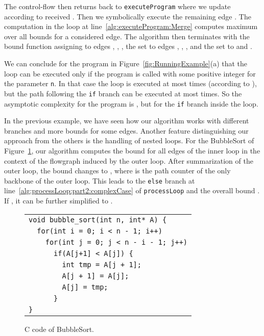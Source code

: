 \documentclass[10pt,a4paper]{article}
\newcommand{\var}[1]{\texttt{#1}}
\begin{document}
The control-flow then returns back to \texttt{executeProgram} where we
update  according to received . Then we
symbolically execute the remaining edge . The computation in
the loop at line~\ref{alg:executeProgram:Merge} computes maximum over
all bounds for a considered edge.  The algorithm then terminates with
the bound function  assigning  to edges
, , , the set  to edges
, , , and the set  to
 and .

We can conclude for the program in Figure~\ref{fig:RunningExample}(a)
that the loop can be executed only if the program is called with some
positive integer  for the parameter \var{n}. In that case
the loop is executed at most  times (according
to ), but the path following the \texttt{if} branch
can be executed at most  times. So
the asymptotic complexity for the program is ,
but  for the \texttt{if} branch inside the loop.



In the previous example, we have seen how our algorithm works with
different branches and more bounds for some edges. Another feature
distinguishing our approach from the others is the handling of nested
loops. For the BubbleSort of Figure~\ref{fig:bubble}, our algorithm
computes the bound  for all edges of
the inner loop in the context of the flowgraph induced by the outer
loop. After summarization of the outer loop, the bound changes to
, where  is the path counter
of the only backbone of the outer loop. This leads to the
\texttt{else} branch at line~\ref{alg:processLoop:part2:complexCase}
of \texttt{processLoop} and the overall bound
. If
, it can be further simplified to
.

\begin{figure}[t] \begin{center}
\begin{tabular}{l}
\texttt{void bubble\_sort(int n, int* A) \{}\\
\texttt{~~for(int i = 0; i < n - 1; i++)}\\
\texttt{~~~~for(int j = 0; j < n - i - 1; j++)}\\
\texttt{~~~~~~if(A[j+1] < A[j]) \{}\\
\texttt{~~~~~~~~int tmp = A[j + 1];}\\
\texttt{~~~~~~~~A[j + 1] = A[j];}\\
\texttt{~~~~~~~~A[j] = tmp;}\\
\texttt{~~~~~~\}}\\
\texttt{\}}\\
\end{tabular}
\end{center}
\caption{C code of BubbleSort.}
\label{fig:bubble}
\end{figure}
\end{document}
